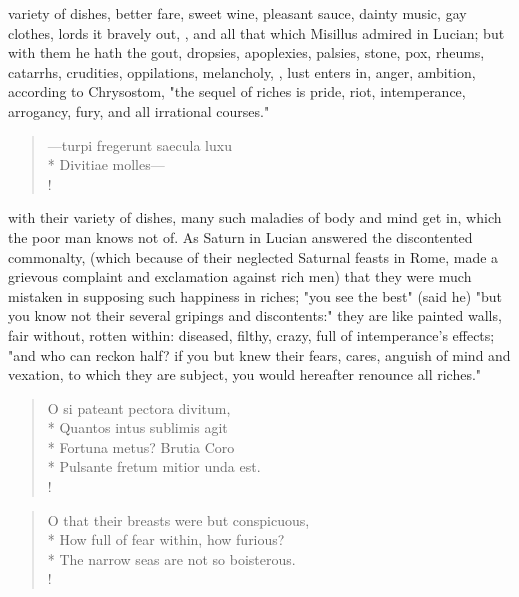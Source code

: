 {variety of dishes, better fare, sweet wine, pleasant sauce, dainty music, gay clothes, lords it bravely out, \etc{}, and all that which Misillus admired in Lucian; but with them he hath the gout, dropsies, apoplexies, palsies, stone, pox, rheums, catarrhs, crudities, oppilations, melancholy, \etc{}, lust enters in, anger, ambition, according to Chrysostom, "the sequel of riches is pride, riot, intemperance, arrogancy, fury, and all irrational courses."

\begin{latin}
\begin{verse}%
---turpi fregerunt saecula luxu\\*
Divitiae molles---\\!
\end{verse}%
\end{latin}
%

with their variety of dishes, many such maladies of body and mind get in, which the poor man knows not of. As Saturn in Lucian answered the discontented commonalty, (which because of their neglected Saturnal feasts in Rome, made a grievous complaint and exclamation against rich men) that they were much mistaken in supposing such happiness in riches; "you see the best" (said he) "but you know not their several gripings and discontents:" they are like painted walls, fair without, rotten within: diseased, filthy, crazy, full of intemperance's effects; "and who can reckon half? if you but knew their fears, cares, anguish of mind and vexation, to which they are subject, you would hereafter renounce all riches."

\begin{latin}
\begin{verse}%
O si pateant pectora divitum,\\*
Quantos intus sublimis agit\\*
Fortuna metus? Brutia Coro\\*
Pulsante fretum mitior unda est.\\!
\end{verse}%
\end{latin}
\translationrule%
\begin{verse}%
O that their breasts were but conspicuous,\\*
How full of fear within, how furious?\\*
The narrow seas are not so boisterous.\\!
\end{verse}%
%

}
